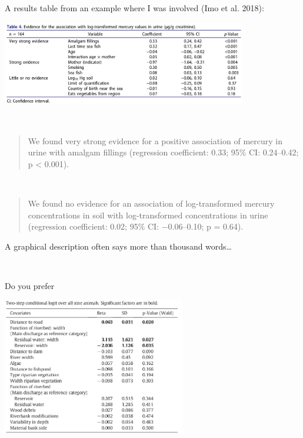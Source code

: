 \documentclass[
  10pt,
  ignorenonframetext,
]{beamer}
\begin{document}
\begin{frame}
A results table from an example where I was involved (Imo et al. 2018):

\centering

\includegraphics[width=0.8\textwidth,height=\textheight]{graphics/hg_table.png}

\(~\)

\begin{quote}
We found very strong evidence for a positive association of mercury in
urine with amalgam fillings (regression coefficient: 0.33; 95\% CI:
0.24--0.42; p \textless{} 0.001).
\end{quote}

\(~\)

\begin{quote}
We found no evidence for an association of log-transformed mercury
concentrations in soil with log-transformed concentrations in urine
(regression coefficient: 0.02; 95\% CI: −0.06--0.10; p = 0.64).
\end{quote}
\end{frame}

\begin{frame}
A graphical description often says more than thousand words\ldots{}

\(~\)

Do you prefer

\centering

\includegraphics[width=0.6\textwidth,height=\textheight]{graphics/weinberger_table.png}
\end{frame}
\end{document}
